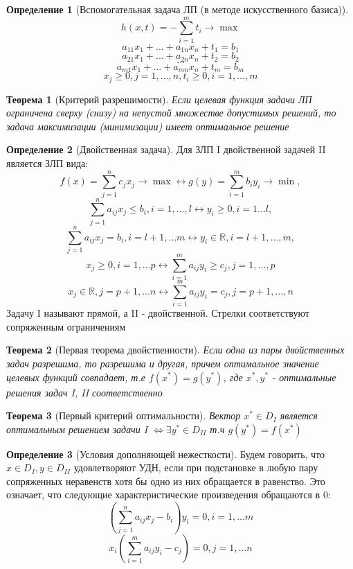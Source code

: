 \documentclass[a4paper]{article}
\newtheorem{theorem}{Теорема}[section]
\theoremstyle{definition}
\newtheorem*{definition}{Определение}
\theoremstyle{remark}
\begin{document}
\begin{definition}[Вспомогательная задача ЛП (в методе искусственного базиса)]
	\[h(x, t) = -\sum_{i = 1}^m t_i\to \max\]
	\[a_{11}x_1 + ... + a_{1n}x_n + t_1 = b_1\]
	\[a_{21}x_1 + ... + a_{2n}x_n + t_2 = b_2\]
	\[\dots\]
	\[a_{m1}x_1 + ... + a_{mn}x_n + t_m = b_m\]
	\[x_j\ge 0, j = 1, ..., n, t_i\ge 0, i = 1, \dots, m\]
\end{definition}
\begin{theorem}[Критерий разрешимости]
    Если целевая функция задачи ЛП ограничена сверху (снизу) на непустой множестве 
	допустимых решений, то задача максимизации (минимизации) имеет оптимальное 
	решение
\end{theorem}
\begin{definition}[Двойственная задача]
    Для ЗЛП I двойственной задачей II является ЗЛП вида:
        $$f(x) = \sum_{j = 1}^n c_j x_j \to \max \leftrightarrow g(y) = \sum_{i = 1}^m b_i y_i\to \min,$$
        $$\sum_{j = 1}^n a_{ij} x_j \leq b_i, i = 1, \dots, l \leftrightarrow y_i\geq 0, i = 1...l,$$
        $$\sum_{j = 1}^n a_{ij} x_j = b_i, i = l+1, \dots m \leftrightarrow y_i\in \mathbb{R}, i = l+1, \dots, m,$$
        $$x_j\geq 0, i = 1, \dots p\leftrightarrow \sum_{i = 1}^m a_{ij} y_i \geq c_j, j = 1, \dots, p$$
        $$x_j \in \mathbb{R}, j = p+1, \dots n \leftrightarrow \sum_{i = 1}^m a_{ij} y_i = c_j, j = p+1, \dots, n$$
        Задачу I называют прямой, а II - двойственной. Стрелки соответствуют сопряженным ограничениям
\end{definition}
\begin{theorem}[Первая теорема двойственности]
    Если одна из пары двойственных задач разрешима, то разрешима и другая, причем оптимальное значение целевых функций совпадает, т.е $f(x^*) = g(y^*)$, где $x^*, y^*$ - оптимальные решения задач I, II соответственно
\end{theorem}
\begin{theorem}[Первый критерий оптимальности]
    Вектор $x^* \in D_I$ является оптимальным решением задачи 
    I $\Leftrightarrow \exists y^* \in D_{II}$ т.ч  $g(y^*) = f(x^*)$    
\end{theorem}
\begin{definition}[Условия дополняющей нежесткости]
    Будем говорить, что $x\in D_I, y \in D_{II}$ удовлетворяют УДН, если при подстановке в любую пару сопряженных неравенств хотя бы одно из них обращается в равенство. Это означает, что следующие характеристические произведения обращаются в 0:
    \[(\sum_{j = 1}^n a_{ij}x_j - b_i)y_i = 0, i  = 1, \dots m\]
    \[x_i (\sum_{i = 1}^m a_{ij}y_i - c_j) = 0, j = 1, \dots n\]
\end{definition}
\end{document}
